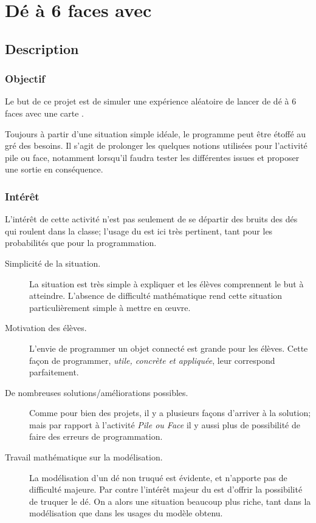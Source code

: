 \section{Dé à 6 faces avec \mb}


\pagestyle{mb}

\subsection{Description}

\subsubsection{Objectif}

\begin{formule}
Le but de ce projet est de simuler une expérience aléatoire de lancer de dé à 6 faces avec une carte \mb.

Toujours à partir d’une situation simple idéale, le programme peut être étoffé au gré des besoins. Il s'agit de prolonger les quelques notions utilisées pour l'activité pile ou face, notamment lorsqu'il faudra tester les différentes issues et proposer une sortie en conséquence.
\end{formule}

\subsubsection{Intérêt}
L'intérêt de cette activité n'est pas seulement de se départir des bruits des dés qui roulent dans la classe; l'usage du \mb est ici très pertinent, tant pour les probabilités que pour la programmation.
\begin{description}
    \item [Simplicité de la situation.] La situation est très simple à expliquer et les élèves comprennent le but à atteindre. L'absence de difficulté mathématique rend cette situation particulièrement simple à mettre en œuvre.
    \item [Motivation des élèves.] L'envie de programmer un objet connecté est grande pour les élèves. Cette façon de programmer, \emph{utile, concrète et appliquée}, leur correspond parfaitement.
    \item [De nombreuses solutions/améliorations possibles.] Comme pour bien des projets, il y a plusieurs façons d'arriver à la solution; mais par rapport à l'activité \emph{Pile ou Face} il y aussi plus de possibilité de faire des erreurs de programmation.
    \item [Travail mathématique sur la modélisation.] La modélisation d'un dé non truqué est évidente, et n'apporte pas de difficulté majeure. Par contre l'intérêt majeur du \mb est d'offrir la possibilité de truquer le dé. On a alors une situation beaucoup plus riche, tant dans la modélisation que dans les usages du modèle obtenu.
\end{description}



